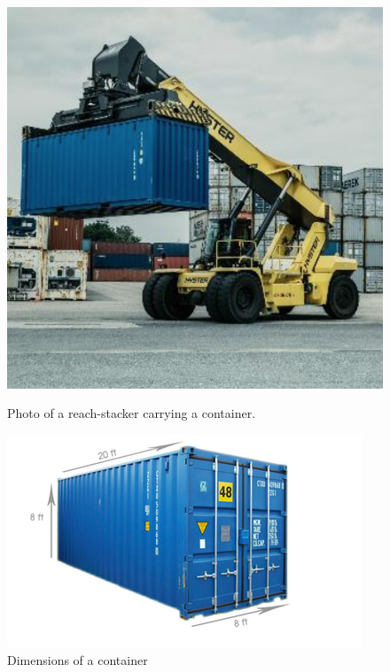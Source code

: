 \documentclass{article}
\begin{document}
\begin{figure}[!htb]
	\begin{minipage}{0.45\linewidth}
		\centering
		\includegraphics[width=0.8\linewidth]{images/PAS_stacker.png}
		\caption{Photo of a reach-stacker carrying a container.}
		\label{fig:pas_reach_stacker}
	\end{minipage}
	\begin{minipage}{0.55\linewidth}
		\centering
		\includegraphics[width=\linewidth]{images/TEU.png}
		\caption{Dimensions of a container}
		\label{fig:teu}
	\end{minipage}
\end{figure}
\end{document}

